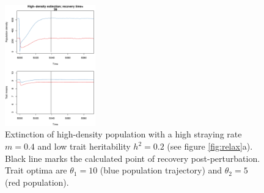 \documentclass[twocolumn,preprintnumbers,amsmath,amssymb,superscriptaddress]{revtex4}
\begin{document}
\begin{figure}
  \captionsetup{justification=raggedright,
singlelinecheck=false
}
\centering
\includegraphics[width=0.35\textwidth]{figs2/fig_relax_large.pdf}
\caption{
Extinction of high-density population with a high straying rate $m=0.4$ and low trait heritability $h^2=0.2$ (see figure \ref{fig:relax}a).
Black line marks the calculated point of recovery post-perturbation.
Trait optima are $\theta_1 = 10$ (blue population trajectory) and $\theta_2 = 5$ (red population).
} \label{fig:relaxtraj_hdlh}
\end{figure}
% 
% 
\end{document}
